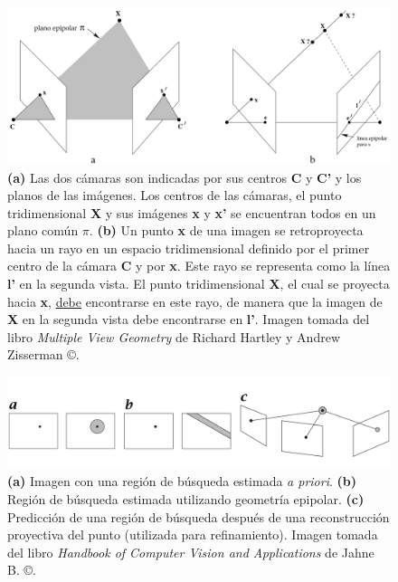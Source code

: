 \begin{figure}[H]
\centering
\includegraphics[width=1.0\textwidth]{images/pointcorrespgeom.png}
\caption[Geometr\'{i}a de correspondencia de puntos]%
{\textbf{(a)} Las dos c\'{a}maras son indicadas por sus centros \textbf{C} y \textbf{C'} y los planos de las im\'{a}genes. Los centros de las c\'{a}maras, el punto tridimensional \textbf{X} y sus im\'{a}genes \textbf{x} y \textbf{x'} se encuentran todos en un plano com\'{u}n \textbf{$\pi$}. \textbf{(b)} Un punto \textbf{x} de una imagen se retroproyecta hacia un rayo en un espacio tridimensional definido por el primer centro de la c\'{a}mara \textbf{C} y por \textbf{x}. Este rayo se representa como la l\'{i}nea \textbf{l'} en la segunda vista. El punto tridimensional \textbf{X}, el cual se proyecta hacia \textbf{x}, \underline{debe} encontrarse en este rayo, de manera que la imagen de \textbf{X} en la segunda vista debe encontrarse en \textbf{l'}. Imagen tomada del libro \textit{Multiple View Geometry} de Richard Hartley y Andrew Zisserman \copyright \cite{Hartley_Zisserman_2003}.}
\label{fig:PointCorrespondenceFGeometry}
\end{figure}


\begin{figure}[H]
\centering
\includegraphics[width=1.0\textwidth]{images/searchregion1.png}
\caption[Restricci\'{o}n del \'{a}rea de b\'{u}squeda de puntos]%
{\textbf{(a)} Imagen con una regi\'{o}n de b\'{u}squeda estimada \textit{a priori}. \textbf{(b)} Regi\'{o}n de b\'{u}squeda estimada utilizando geometr\'{i}a epipolar. \textbf{(c)} Predicci\'{o}n de una regi\'{o}n de b\'{u}squeda despu\'{e}s de una reconstrucci\'{o}n proyectiva del punto (utilizada para refinamiento). Imagen tomada del libro \textit{Handbook of Computer Vision and Applications} de Jahne B. \copyright \cite{Jahne_Haussecker_Geibler_1999}.}
\label{fig:SearchRegion1}
\end{figure}


